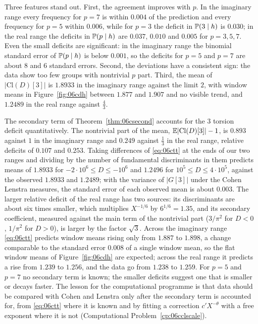 Three features stand out. First, the agreement improves with $p$. In the imaginary range every frequency for $p = 7$ is within $0.004$ of the prediction and every frequency for $p = 5$ within $0.006$, while for $p = 3$ the deficit in $\mathbb{P}(3\mid h)$ is $0.030$; in the real range the deficits in $\mathbb{P}(p\mid h)$ are $0.037$, $0.010$ and $0.005$ for $p = 3,5,7$. Even the small deficits are significant: in the imaginary range the binomial standard error of $\mathbb{P}(p\mid h)$ is below $0.001$, so the deficits for $p = 5$ and $p = 7$ are about $8$ and $6$ standard errors. Second, the deviations have a consistent sign: the data show too few groups with nontrivial $p$ part. Third, the mean of $|\mathrm{Cl}(D)[3]|$ is $1.8933$ in the imaginary range against the limit $2$, with window means in Figure~\ref{fig:06cdh} between $1.877$ and $1.907$ and no visible trend, and $1.2489$ in the real range against $\frac43$.

The secondary term of Theorem~\ref{thm:06csecond} accounts for the $3$ torsion deficit quantitatively. The nontrivial part of the mean, $\mathbb{E}|\mathrm{Cl}(D)[3]|-1$, is $0.893$ against $1$ in the imaginary range and $0.249$ against $\frac13$ in the real range, relative deficits of $0.107$ and $0.253$. Taking differences of \eqref{eq:06ctt} at the ends of our two ranges and dividing by the number of fundamental discriminants in them predicts means of $1.8933$ for $-2\cdot10^6\le D\le-10^6$ and $1.2496$ for $10^5\le D\le4\cdot10^5$, against the observed $1.8933$ and $1.2489$; with the variance of $|G[3]|$ under the Cohen Lenstra measures, the standard error of each observed mean is about $0.003$. The larger relative deficit of the real range has two sources: its discriminants are about six times smaller, which multiplies $X^{-1/6}$ by $6^{1/6} = 1.35$, and its secondary coefficient, measured against the main term of the nontrivial part ($3/\pi^2$ for $D<0$, $1/\pi^2$ for $D>0$), is larger by the factor $\sqrt3$. Across the imaginary range \eqref{eq:06ctt} predicts window means rising only from $1.887$ to $1.898$, a change comparable to the standard error $0.008$ of a single window mean, so the flat window means of Figure~\ref{fig:06cdh} are expected; across the real range it predicts a rise from $1.239$ to $1.256$, and the data go from $1.238$ to $1.259$. For $p = 5$ and $p = 7$ no secondary term is known; the smaller deficits suggest one that is smaller or decays faster. The lesson for the computational programme is that data should be compared with Cohen and Lenstra only after the secondary term is accounted for, from \eqref{eq:06ctt} where it is known and by fitting a correction $c'X^{-\theta}$ with a free exponent where it is not (Computational Problem~\ref{cp:06cclscale}).

